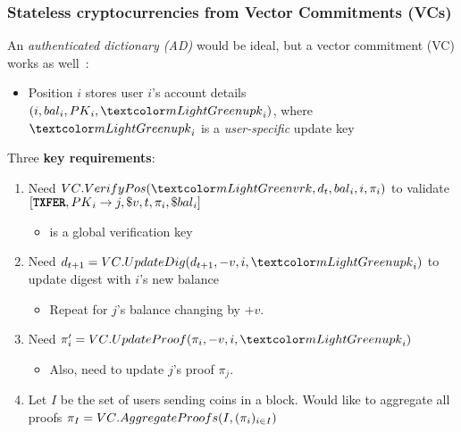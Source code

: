 \begin{frame}
    \frametitle{Stateless cryptocurrencies from Vector Commitments (VCs)}

    An \textit{authenticated dictionary (AD)} would be ideal, but a \alert{vector commitment (VC)} works as well~\cite{CPZ18}:
    \begin{itemize}
        \item Position $i$ stores user $i$'s account details $(i,\bal_i,\PK_i,\upk_i)$, where $\upk_i$ is a \emph{user-specific} \alert{update key}
    \end{itemize}

    Three \textbf{key requirements}:
    \begin{enumerate}
        \item Need $\vcverifypos(\vrk, d_t, \bal_i, i, \pi_i)$ to \alert{validate} $[\texttt{\textbf{TXFER}}, {PK}_i \rightarrow j, \$v, {t}, {\pi_i}, {\${bal}_i}]$
        \begin{itemize}
            \item \vrk is a global \alert{verification key}
        \end{itemize}
        \item Need $d_{t+1}=\vccommupdate(d_{t+1}, -v, i, \upk_i)$ to update digest with $i$'s new balance
        \begin{itemize}
            \item Repeat for $j$'s balance changing by $+v$.
        \end{itemize}
        \item Need $\pi_i' = \vcproofupdate(\pi_i, -v, i, \upk_i)$
        \begin{itemize}
            \item Also, need to update $j$'s proof $\pi_j$.
        \end{itemize}
        \item Let $I$ be the set of users sending coins in a block. Would like to aggregate all proofs $\pi_I = {VC}.{AggregateProofs}(I, (\pi_i)_{i\in I})$
    \end{enumerate}
\end{frame}